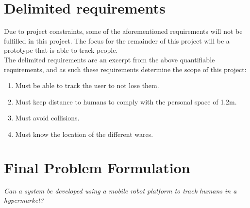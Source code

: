\section{Delimited requirements}\label{sec:delReq}
Due to project constraints, some of the aforementioned requirements will not be fulfilled in this project. The focus for the remainder of this project will be a prototype that is able to track people.\\

The delimited requirements are an excerpt from the above quantifiable requirements, and as such these requirements determine the scope of this project:

\begin{enumerate}[label=\Roman*.]

    \item Must be able to track the user to not lose them.
    \item Must keep distance to humans to comply with the personal space of 1.2m.
    \item Must avoid collisions.
    \item Must know the location of the different wares.
    
\end{enumerate}

\section{Final Problem Formulation}\label{sec:final}
\textit{Can a system be developed using a mobile robot platform to track humans in a hypermarket?}